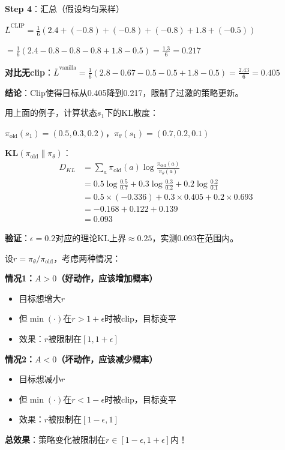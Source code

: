 \documentclass[11pt,a4paper]{article}
\theoremstyle{definition}
\begin{document}
\begin{calculation}
\textbf{Step 4}：汇总（假设均匀采样）

$\bar{L}^{\text{CLIP}} = \frac{1}{6}(2.4 + (-0.8) + (-0.8) + (-0.8) + 1.8 + (-0.5))$

$= \frac{1}{6}(2.4 - 0.8 - 0.8 - 0.8 + 1.8 - 0.5) = \frac{1.3}{6} = 0.217$

\textbf{对比无clip}：$\bar{L}^{\text{vanilla}} = \frac{1}{6}(2.8 - 0.67 - 0.5 - 0.5 + 1.8 - 0.5) = \frac{2.43}{6} = 0.405$

\textbf{结论}：Clip使得目标从0.405降到0.217，限制了过激的策略更新。
\end{calculation}

\begin{calculation}[手算KL散度]
用上面的例子，计算状态$s_1$下的KL散度：

$\pi_{\text{old}}(s_1) = (0.5, 0.3, 0.2)$，$\pi_\theta(s_1) = (0.7, 0.2, 0.1)$

\textbf{KL}$(\pi_{\text{old}} \| \pi_\theta)$：
\begin{align*}
D_{KL} &= \sum_a \pi_{\text{old}}(a) \log \frac{\pi_{\text{old}}(a)}{\pi_\theta(a)} \\
&= 0.5 \log \frac{0.5}{0.7} + 0.3 \log \frac{0.3}{0.2} + 0.2 \log \frac{0.2}{0.1} \\
&= 0.5 \times (-0.336) + 0.3 \times 0.405 + 0.2 \times 0.693 \\
&= -0.168 + 0.122 + 0.139 \\
&= 0.093
\end{align*}

\textbf{验证}：$\epsilon = 0.2$对应的理论KL上界$\approx 0.25$，实测0.093在范围内。
\end{calculation}

\begin{keypoint}[理解Clip目标]
设$r = \pi_\theta / \pi_{\text{old}}$，考虑两种情况：

\textbf{情况1：$A > 0$（好动作，应该增加概率）}
\begin{itemize}
    \item 目标想增大$r$
    \item 但$\min(\cdot)$在$r > 1+\epsilon$时被clip，目标变平
    \item 效果：$r$被限制在$[1, 1+\epsilon]$
\end{itemize}

\textbf{情况2：$A < 0$（坏动作，应该减少概率）}
\begin{itemize}
    \item 目标想减小$r$
    \item 但$\min(\cdot)$在$r < 1-\epsilon$时被clip，目标变平
    \item 效果：$r$被限制在$[1-\epsilon, 1]$
\end{itemize}

\textbf{总效果}：策略变化被限制在$r \in [1-\epsilon, 1+\epsilon]$内！
\end{keypoint}
\end{document}
